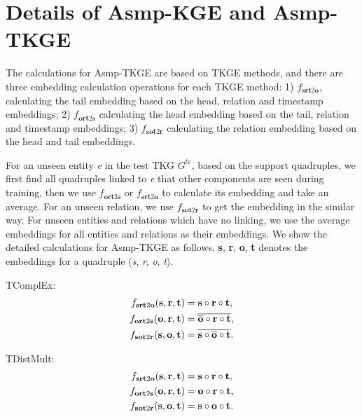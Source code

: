 \documentclass[sigconf]{acmart}
\begin{document}
\section{Details of A\lowercase{smp}-KGE and A\lowercase{smp}-TKGE}
\label{E}
The calculations for Asmp-TKGE are based on TKGE methods, and there are three embedding calculation operations for each TKGE method: 1) $f_{\textbf{srt} 2 \textbf{o}}$, calculating the tail embedding based on the head, relation and timestamp embeddings; 2) $f_{\textbf{ort} 2 \textbf{s}}$
calculating the head embedding based on the tail, relation and timestamp embeddings; 3) $f_{\textbf{sot} 2 \textbf{r}}$ calculating the relation embedding based on the head and tail embeddings.
\par
For an unseen entity \emph{e} in the test TKG $ {G}^{t e}$, based on the support quadruples, we first find all quadruples linked to \emph{e} that other components are seen during training, then we use $f_{\textbf{ort} 2 \textbf{s}}$ or $f_{\textbf{srt} 2 \textbf{o}}$ to calculate its embedding and take an average. For an unseen relation, we use $f_{\textbf{sot} 2 \textbf{r}}$ to get the embedding in the similar way. For unseen entities and relations which have no linking, we use the average embeddings for all entities and relations as their embeddings. We show the detailed calculations for Asmp-TKGE as follows. \textbf{s}, \textbf{r}, \textbf{o}, \textbf{t} denotes the embeddings for a quadruple (\emph{s}, \emph{r}, \emph{o}, \emph{t}).
\par
TComplEx:
\begin{equation}
\begin{aligned}
f_{\textbf{srt} 2 \textbf{o}}(\textbf{s}, \textbf{r}, \textbf{t}) &=\textbf{s} \circ \textbf{r} \circ \textbf{t}, \\
f_{\textbf{ort} 2 \textbf{s}}(\textbf{o}, \textbf{r}, \textbf{t}) &=\overline{\overline{\textbf{o}} \circ \textbf{r} \circ \textbf{t}}, \\
f_{\textbf{sot} 2 \textbf{r}}(\textbf{s}, \textbf{o}, \textbf{t}) &=\overline{\textbf{s} \circ \overline{\textbf{o}} \circ \textbf{t}}.
\notag
\end{aligned}
\end{equation}

\par
TDistMult:
\begin{equation}
\begin{aligned}
f_{\textbf{srt} 2 \textbf{o}}(\textbf{s}, \textbf{r}, \textbf{t}) &=\textbf{s} \circ \textbf{r} \circ \textbf{t}, \\
f_{\textbf{ort} 2 \textbf{s}}(\textbf{o}, \textbf{r}, \textbf{t}) &=\textbf{o} \circ \textbf{r} \circ \textbf{t}, \\
f_{\textbf{sot} 2 \textbf{r}}(\textbf{s}, \textbf{o}, \textbf{t}) &=\textbf{s} \circ \textbf{o} \circ \textbf{t}.
\notag
\end{aligned}
\end{equation}
\end{document}
